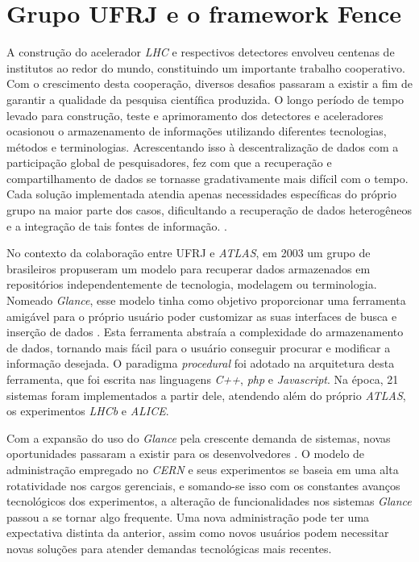 \section{Grupo UFRJ e o framework Fence}
A construção do acelerador \emph{LHC} e respectivos detectores envolveu centenas de institutos ao redor do mundo, constituindo um importante trabalho cooperativo. Com o crescimento desta cooperação, diversos desafios passaram a existir a fim de garantir a qualidade da pesquisa científica produzida. O longo período de tempo levado para construção, teste e aprimoramento dos detectores e aceleradores ocasionou o armazenamento de informações utilizando diferentes tecnologias, métodos e terminologias. Acrescentando isso à descentralização de dados com a participação global de pesquisadores, fez com que a recuperação e compartilhamento de dados se tornasse gradativamente mais difícil com o tempo. Cada solução implementada atendia apenas necessidades específicas do próprio grupo na maior parte dos casos, dificultando a recuperação de dados heterogêneos e a integração de tais fontes de informação. \cite{grael}.

No contexto da colaboração entre UFRJ e \emph{ATLAS}, em 2003 um grupo de brasileiros propuseram um modelo para recuperar dados armazenados em repositórios independentemente de tecnologia, modelagem ou terminologia. Nomeado \emph{Glance}, esse modelo tinha como objetivo proporcionar uma ferramenta amigável para o próprio usuário poder customizar as suas interfaces de busca e inserção de dados \cite{maidantchik}. Esta ferramenta abstraía a complexidade do armazenamento de dados, tornando mais fácil para o usuário conseguir procurar e modificar a informação desejada. O paradigma \emph{procedural} foi adotado na arquitetura desta ferramenta, que foi escrita nas linguagens \emph{C++}, \emph{php} e \emph{Javascript}. Na época, 21 sistemas foram implementados a partir dele, atendendo além do próprio \emph{ATLAS}, os experimentos \emph{LHCb} e \emph{ALICE}.

Com a expansão do uso do \emph{Glance} pela crescente demanda de sistemas, novas oportunidades passaram a existir para os desenvolvedores \cite{ramos}. O modelo de administração empregado no \emph{CERN} e seus experimentos se baseia em uma alta rotatividade nos cargos gerenciais, e somando-se isso com os constantes avanços tecnológicos dos experimentos, a alteração de funcionalidades nos sistemas \emph{Glance} passou a se tornar algo frequente. Uma nova administração pode ter uma expectativa distinta da anterior, assim como novos usuários podem necessitar novas soluções para atender demandas tecnológicas mais recentes.

